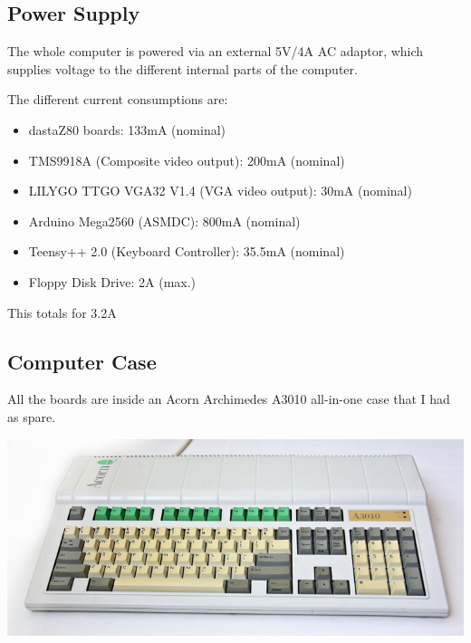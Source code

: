 \documentclass[a4paper,11pt]{article}
\begin{document}
    \subsection{Power Supply}

    The whole computer is powered via an external 5V/4A AC adaptor, which
    supplies voltage to the different internal parts of the computer.

    The different current consumptions are:

    \begin{itemize}
        \item dastaZ80 boards: 133mA (nominal)
        \item TMS9918A (Composite video output): 200mA (nominal)
        \item LILYGO TTGO VGA32 V1.4 (VGA video output): 30mA (nominal)
        \item Arduino Mega2560 (ASMDC): 800mA (nominal)
        \item Teensy++ 2.0 (Keyboard Controller): 35.5mA (nominal)
        \item Floppy Disk Drive: 2A (max.)
    \end{itemize}

    This totals for 3.2A

    \subsection{Computer Case}

    All the boards are inside an Acorn Archimedes A3010 all-in-one case that I
    had as spare.

    \begin{center}
        \includegraphics{images/acorn3010top.png}
    \end{center}
\end{document}
